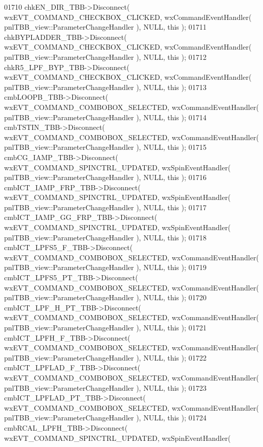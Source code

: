 \begin{DoxyCode}
01710     chkEN_DIR_TBB->Disconnect( wxEVT\_COMMAND\_CHECKBOX\_CLICKED, wxCommandEventHandler( 
      pnlTBB_view::ParameterChangeHandler ), NULL, \textcolor{keyword}{this} );
01711     chkBYPLADDER_TBB->Disconnect( wxEVT\_COMMAND\_CHECKBOX\_CLICKED, wxCommandEventHandler( 
      pnlTBB_view::ParameterChangeHandler ), NULL, \textcolor{keyword}{this} );
01712     chkR5_LPF_BYP_TBB->Disconnect( wxEVT\_COMMAND\_CHECKBOX\_CLICKED, wxCommandEventHandler( 
      pnlTBB_view::ParameterChangeHandler ), NULL, \textcolor{keyword}{this} );
01713     cmbLOOPB_TBB->Disconnect( wxEVT\_COMMAND\_COMBOBOX\_SELECTED, wxCommandEventHandler( 
      pnlTBB_view::ParameterChangeHandler ), NULL, \textcolor{keyword}{this} );
01714     cmbTSTIN_TBB->Disconnect( wxEVT\_COMMAND\_COMBOBOX\_SELECTED, wxCommandEventHandler( 
      pnlTBB_view::ParameterChangeHandler ), NULL, \textcolor{keyword}{this} );
01715     cmbCG_IAMP_TBB->Disconnect( wxEVT\_COMMAND\_SPINCTRL\_UPDATED, wxSpinEventHandler( 
      pnlTBB_view::ParameterChangeHandler ), NULL, \textcolor{keyword}{this} );
01716     cmbICT_IAMP_FRP_TBB->Disconnect( wxEVT\_COMMAND\_SPINCTRL\_UPDATED, wxSpinEventHandler( 
      pnlTBB_view::ParameterChangeHandler ), NULL, \textcolor{keyword}{this} );
01717     cmbICT_IAMP_GG_FRP_TBB->Disconnect( wxEVT\_COMMAND\_SPINCTRL\_UPDATED, wxSpinEventHandler( 
      pnlTBB_view::ParameterChangeHandler ), NULL, \textcolor{keyword}{this} );
01718     cmbICT_LPFS5_F_TBB->Disconnect( wxEVT\_COMMAND\_COMBOBOX\_SELECTED, wxCommandEventHandler( 
      pnlTBB_view::ParameterChangeHandler ), NULL, \textcolor{keyword}{this} );
01719     cmbICT_LPFS5_PT_TBB->Disconnect( wxEVT\_COMMAND\_COMBOBOX\_SELECTED, wxCommandEventHandler( 
      pnlTBB_view::ParameterChangeHandler ), NULL, \textcolor{keyword}{this} );
01720     cmbICT_LPF_H_PT_TBB->Disconnect( wxEVT\_COMMAND\_COMBOBOX\_SELECTED, wxCommandEventHandler( 
      pnlTBB_view::ParameterChangeHandler ), NULL, \textcolor{keyword}{this} );
01721     cmbICT_LPFH_F_TBB->Disconnect( wxEVT\_COMMAND\_COMBOBOX\_SELECTED, wxCommandEventHandler( 
      pnlTBB_view::ParameterChangeHandler ), NULL, \textcolor{keyword}{this} );
01722     cmbICT_LPFLAD_F_TBB->Disconnect( wxEVT\_COMMAND\_COMBOBOX\_SELECTED, wxCommandEventHandler( 
      pnlTBB_view::ParameterChangeHandler ), NULL, \textcolor{keyword}{this} );
01723     cmbICT_LPFLAD_PT_TBB->Disconnect( wxEVT\_COMMAND\_COMBOBOX\_SELECTED, wxCommandEventHandler( 
      pnlTBB_view::ParameterChangeHandler ), NULL, \textcolor{keyword}{this} );
01724     cmbRCAL_LPFH_TBB->Disconnect( wxEVT\_COMMAND\_SPINCTRL\_UPDATED, wxSpinEventHandler( 

\end{DoxyCode}
